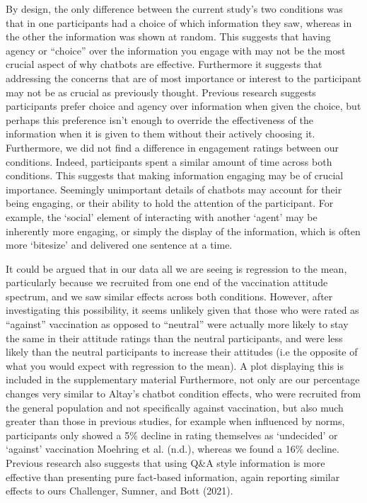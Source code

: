 \documentclass[
  english,
  ,jou,floatsintext]{apa6}
\begin{document}
By design, the only difference between the current study's two conditions was that in one participants had a choice of which information they saw, whereas in the other the information was shown at random. This suggests that having agency or ``choice'' over the information you engage with may not be the most crucial aspect of why chatbots are effective. Furthermore it suggests that addressing the concerns that are of most importance or interest to the participant may not be as crucial as previously thought. Previous research suggests participants prefer choice and agency over information when given the choice, but perhaps this preference isn't enough to override the effectiveness of the information when it is given to them without their actively choosing it. Furthermore, we did not find a difference in engagement ratings between our conditions. Indeed, participants spent a similar amount of time across both conditions. This suggests that making information engaging may be of crucial importance. Seemingly unimportant details of chatbots may account for their being engaging, or their ability to hold the attention of the participant. For example, the `social' element of interacting with another `agent' may be inherently more engaging, or simply the display of the information, which is often more `bitesize' and delivered one sentence at a time.

It could be argued that in our data all we are seeing is regression to the mean, particularly because we recruited from one end of the vaccination attitude spectrum, and we saw similar effects across both conditions. However, after investigating this possibility, it seems unlikely given that those who were rated as ``against'' vaccination as opposed to ``neutral'' were actually more likely to stay the same in their attitude ratings than the neutral participants, and were less likely than the neutral participants to increase their attitudes (i.e the opposite of what you would expect with regression to the mean). A plot displaying this is included in the supplementary material Furthermore, not only are our percentage changes very similar to Altay's chatbot condition effects, who were recruited from the general population and not specifically against vaccination, but also much greater than those in previous studies, for example when influenced by norms, participants only showed a 5\% decline in rating themselves as `undecided' or `against' vaccination Moehring et al. (n.d.), whereas we found a 16\% decline. Previous research also suggests that using Q\&A style information is more effective than presenting pure fact-based information, again reporting similar effects to ours Challenger, Sumner, and Bott (2021).
\end{document}
